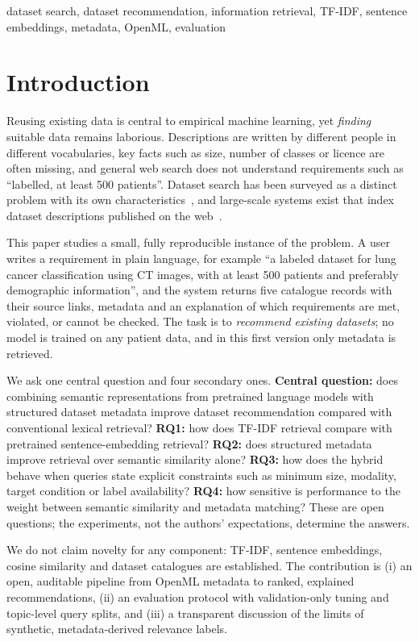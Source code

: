 \documentclass[conference]{IEEEtran}
\begin{document}
\begin{IEEEkeywords}
dataset search, dataset recommendation, information retrieval, TF-IDF, sentence embeddings, metadata, OpenML, evaluation
\end{IEEEkeywords}

\section{Introduction}
Reusing existing data is central to empirical machine learning, yet \emph{finding} suitable data remains laborious. Descriptions are written by different people in different vocabularies, key facts such as size, number of classes or licence are often missing, and general web search does not understand requirements such as ``labelled, at least 500 patients''. Dataset search has been surveyed as a distinct problem with its own characteristics~\cite{chapman2020dataset}, and large-scale systems exist that index dataset descriptions published on the web~\cite{brickley2019google}.

This paper studies a small, fully reproducible instance of the problem. A user writes a requirement in plain language, for example ``a labeled dataset for lung cancer classification using CT images, with at least 500 patients and preferably demographic information'', and the system returns five catalogue records with their source links, metadata and an explanation of which requirements are met, violated, or cannot be checked. The task is to \emph{recommend existing datasets}; no model is trained on any patient data, and in this first version only metadata is retrieved.

We ask one central question and four secondary ones. \textbf{Central question:} does combining semantic representations from pretrained language models with structured dataset metadata improve dataset recommendation compared with conventional lexical retrieval? \textbf{RQ1:} how does TF-IDF retrieval compare with pretrained sentence-embedding retrieval? \textbf{RQ2:} does structured metadata improve retrieval over semantic similarity alone? \textbf{RQ3:} how does the hybrid behave when queries state explicit constraints such as minimum size, modality, target condition or label availability? \textbf{RQ4:} how sensitive is performance to the weight between semantic similarity and metadata matching? These are open questions; the experiments, not the authors' expectations, determine the answers.

We do not claim novelty for any component: TF-IDF, sentence embeddings, cosine similarity and dataset catalogues are established. The contribution is (i) an open, auditable pipeline from OpenML metadata to ranked, explained recommendations, (ii) an evaluation protocol with validation-only tuning and topic-level query splits, and (iii) a transparent discussion of the limits of synthetic, metadata-derived relevance labels.
\end{document}
